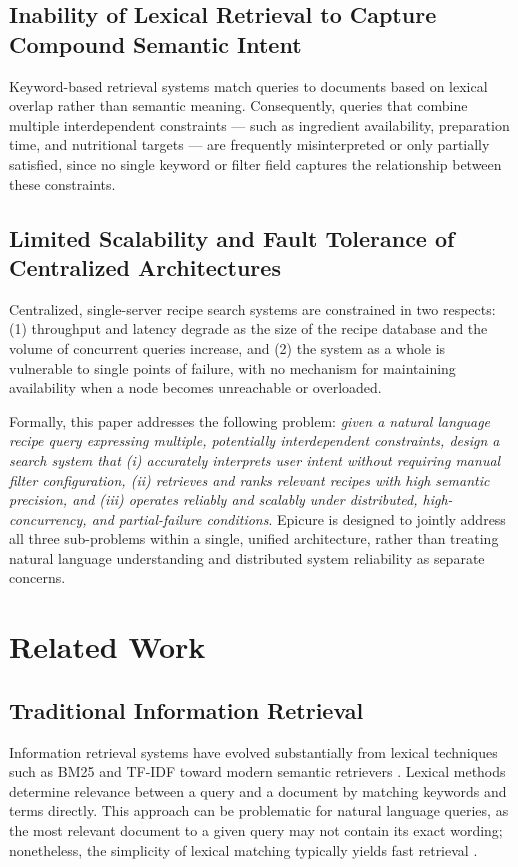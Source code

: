 \documentclass[conference]{IEEEtran}
\begin{document}
\subsection{Inability of Lexical Retrieval to Capture Compound Semantic Intent}
Keyword-based retrieval systems match queries to documents based on lexical overlap rather than semantic meaning. Consequently, queries that combine multiple interdependent constraints — such as ingredient availability, preparation time, and nutritional targets — are frequently misinterpreted or only partially satisfied, since no single keyword or filter field captures the relationship between these constraints.

\subsection{Limited Scalability and Fault Tolerance of Centralized Architectures}
Centralized, single-server recipe search systems are constrained in two respects: (1) throughput and latency degrade as the size of the recipe database and the volume of concurrent queries increase, and (2) the system as a whole is vulnerable to single points of failure, with no mechanism for maintaining availability when a node becomes unreachable or overloaded.

Formally, this paper addresses the following problem: \textit{given a natural language recipe query expressing multiple, potentially interdependent constraints, design a search system that (i) accurately interprets user intent without requiring manual filter configuration, (ii) retrieves and ranks relevant recipes with high semantic precision, and (iii) operates reliably and scalably under distributed, high-concurrency, and partial-failure conditions}. Epicure is designed to jointly address all three sub-problems within a single, unified architecture, rather than treating natural language understanding and distributed system reliability as separate concerns.

\section{Related Work}
\label{sec:related_work}
\subsection{Traditional Information Retrieval}
Information retrieval systems have evolved substantially from lexical techniques such as BM25 and TF-IDF toward modern semantic retrievers \cite{Farivar2025SemanticSF}. Lexical methods determine relevance between a query and a document by matching keywords and terms directly. This approach can be problematic for natural language queries, as the most relevant document to a given query may not contain its exact wording; nonetheless, the simplicity of lexical matching typically yields fast retrieval \cite{Harris2025ComparingLA}.
\end{document}
